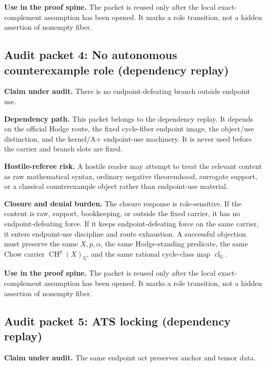 \documentclass[11pt]{article}
\newcommand{\QQ}{\mathbb{Q}}
\newcommand{\CH}{\operatorname{CH}}
\newcommand{\clQ}{\operatorname{cl}_{\QQ}}
\begin{document}
\par\noindent\textbf{Use in the proof spine.} The packet is reused only after the local exact-complement assumption has been opened. It marks a role transition, not a hidden assertion of nonempty fiber.


\subsection{Audit packet 4: No autonomous counterexample role (dependency replay)}


\par\noindent\textbf{Claim under audit.} There is no endpoint-defeating branch outside endpoint use.


\par\noindent\textbf{Dependency path.} This packet belongs to the dependency replay. It depends on the official Hodge route, the fixed cycle-fiber endpoint image, the object/use distinction, and the kernel/A+ endpoint-use machinery. It is never used before the carrier and branch slots are fixed.


\par\noindent\textbf{Hostile-referee risk.} A hostile reader may attempt to treat the relevant content as raw mathematical syntax, ordinary negative theoremhood, surrogate support, or a classical counterexample object rather than endpoint-use material.


\par\noindent\textbf{Closure and denial burden.} The closure response is role-sensitive. If the content is raw, support, bookkeeping, or outside the fixed carrier, it has no endpoint-defeating force. If it keeps endpoint-defeating force on the same carrier, it enters endpoint-use discipline and route exhaustion. A successful objection must preserve the same $X,p,\alpha$, the same Hodge-standing predicate, the same Chow carrier $\CH^p(X)_\QQ$, and the same rational cycle-class map $\clQ$.


\par\noindent\textbf{Use in the proof spine.} The packet is reused only after the local exact-complement assumption has been opened. It marks a role transition, not a hidden assertion of nonempty fiber.


\subsection{Audit packet 5: ATS locking (dependency replay)}


\par\noindent\textbf{Claim under audit.} The same endpoint act preserves anchor and tensor data.
\end{document}
